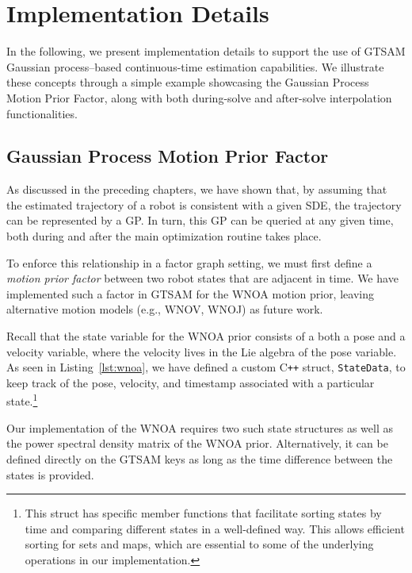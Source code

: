 \section{Implementation Details}
\label{sec:imp}
In the following, we present implementation details to support the use of \ac{GTSAM} Gaussian process–based continuous-time estimation capabilities. We illustrate these concepts through a simple example showcasing the Gaussian Process Motion Prior Factor, along with both during-solve and after-solve interpolation functionalities.

\subsection{Gaussian Process Motion Prior Factor}

As discussed in the preceding chapters, we have shown that, by assuming that the estimated trajectory of a robot is consistent with a given \ac{SDE}, the trajectory can be represented by a \ac{GP}.
In turn, this \ac{GP} can be queried at any given time, both during and after the main optimization routine takes place.

To enforce this relationship in a factor graph setting, we must first define a \emph{motion prior factor} between two robot states that are adjacent in time.
We have implemented such a factor in \ac{GTSAM} for the \ac{WNOA} motion prior, leaving alternative motion models (e.g., \ac{WNOV}, \ac{WNOJ}) as future work. 
 
Recall that the state variable for the \ac{WNOA} prior consists of a both a pose and a velocity variable, where the velocity lives in the Lie algebra of the pose variable.
As seen in Listing~\ref{lst:wnoa}, we have defined a custom C\texttt{++} struct, \texttt{StateData}, to keep track of the pose, velocity, and timestamp associated with a particular state.\footnote{This struct has specific member functions that facilitate sorting states by time and comparing different states in a well-defined way. This allows efficient sorting for sets and maps, which are essential to some of the underlying operations in our implementation.}

Our implementation of the \ac{WNOA} requires two such state structures as well as the power spectral density matrix of the \ac{WNOA} prior. Alternatively, it can be defined directly on the \ac{GTSAM} keys as long as the time difference between the states is provided.

